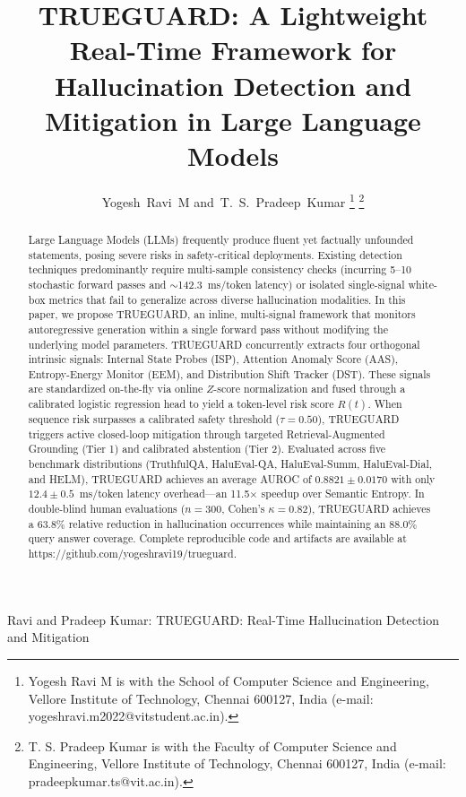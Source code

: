 \documentclass[journal]{IEEEtran}
\begin{document}
\title{TRUEGUARD: A Lightweight Real-Time Framework for Hallucination Detection and Mitigation in Large Language Models}

\author{Yogesh~Ravi~M and~T.~S.~Pradeep~Kumar%
\thanks{Yogesh Ravi M is with the School of Computer Science and Engineering, Vellore Institute of Technology, Chennai 600127, India (e-mail: yogeshravi.m2022@vitstudent.ac.in).}%
\thanks{T. S. Pradeep Kumar is with the Faculty of Computer Science and Engineering, Vellore Institute of Technology, Chennai 600127, India (e-mail: pradeepkumar.ts@vit.ac.in).}%
}

%
{Ravi and Pradeep Kumar: TRUEGUARD: Real-Time Hallucination Detection and Mitigation}

\maketitle

\begin{abstract}
Large Language Models (LLMs) frequently produce fluent yet factually unfounded statements, posing severe risks in safety-critical deployments. Existing detection techniques predominantly require multi-sample consistency checks (incurring 5--10 stochastic forward passes and $\sim$142.3~ms/token latency) or isolated single-signal white-box metrics that fail to generalize across diverse hallucination modalities. In this paper, we propose TRUEGUARD, an inline, multi-signal framework that monitors autoregressive generation within a single forward pass without modifying the underlying model parameters. TRUEGUARD concurrently extracts four orthogonal intrinsic signals: Internal State Probes (ISP), Attention Anomaly Score (AAS), Entropy-Energy Monitor (EEM), and Distribution Shift Tracker (DST). These signals are standardized on-the-fly via online $Z$-score normalization and fused through a calibrated logistic regression head to yield a token-level risk score $R(t)$. When sequence risk surpasses a calibrated safety threshold ($\tau = 0.50$), TRUEGUARD triggers active closed-loop mitigation through targeted Retrieval-Augmented Grounding (Tier 1) and calibrated abstention (Tier 2). Evaluated across five benchmark distributions (TruthfulQA, HaluEval-QA, HaluEval-Summ, HaluEval-Dial, and HELM), TRUEGUARD achieves an average AUROC of $0.8821 \pm 0.0170$ with only $12.4 \pm 0.5$~ms/token latency overhead---an 11.5$\times$ speedup over Semantic Entropy. In double-blind human evaluations ($n = 300$, Cohen's $\kappa = 0.82$), TRUEGUARD achieves a 63.8\% relative reduction in hallucination occurrences while maintaining an 88.0\% query answer coverage. Complete reproducible code and artifacts are available at https://github.com/yogeshravi19/trueguard.
\end{abstract}
\end{document}
